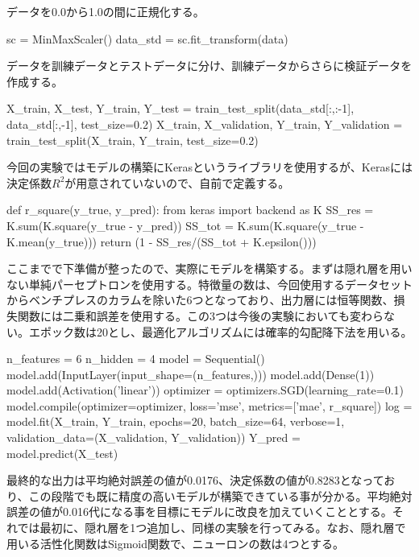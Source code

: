 \documentclass{article}
\begin{document}
データを0.0から1.0の間に正規化する。
\\

\begin{python}
sc = MinMaxScaler()
data_std = sc.fit_transform(data)
\end{python}

データを訓練データとテストデータに分け、訓練データからさらに検証データを作成する。
\\


\begin{python}
X_train, X_test, Y_train, Y_test = 
train_test_split(data_std[:,:-1], data_std[:,-1], test_size=0.2)
X_train, X_validation, Y_train, Y_validation = 
train_test_split(X_train, Y_train, test_size=0.2)
\end{python}

今回の実験ではモデルの構築にKerasというライブラリを使用するが、Kerasには決定係数\begin{math}R^2\end{math}が用意されていないので、自前で定義する。
\\

\begin{python}
def r_square(y_true, y_pred):
    from keras import backend as K
    SS_res =  K.sum(K.square(y_true - y_pred)) 
    SS_tot = K.sum(K.square(y_true - K.mean(y_true))) 
    return (1 - SS_res/(SS_tot + K.epsilon()))
\end{python}

ここまでで下準備が整ったので、実際にモデルを構築する。まずは隠れ層を用いない単純パーセプトロンを使用する。特徴量の数は、今回使用するデータセットからベンチプレスのカラムを除いた6つとなっており、出力層には恒等関数、損失関数には二乗和誤差を使用する。この3つは今後の実験においても変わらない。エポック数は20とし、最適化アルゴリズムには確率的勾配降下法を用いる。
\\

\begin{python}
n_features = 6
n_hidden   = 4
model = Sequential()
model.add(InputLayer(input_shape=(n_features,)))
model.add(Dense(1))
model.add(Activation('linear'))
optimizer = optimizers.SGD(learning_rate=0.1)
model.compile(optimizer=optimizer,
              loss='mse', metrics=['mae', r_square])
log = model.fit(X_train, Y_train, epochs=20, batch_size=64, 
verbose=1,
         validation_data=(X_validation, Y_validation))
Y_pred = model.predict(X_test)
\end{python}

最終的な出力は平均絶対誤差の値が0.0176、決定係数の値が0.8283となっており、この段階でも既に精度の高いモデルが構築できている事が分かる。平均絶対誤差の値が0.016代になる事を目標にモデルに改良を加えていくこととする。それでは最初に、隠れ層を1つ追加し、同様の実験を行ってみる。なお、隠れ層で用いる活性化関数はSigmoid関数で、ニューロンの数は4つとする。
\\
\end{document}
